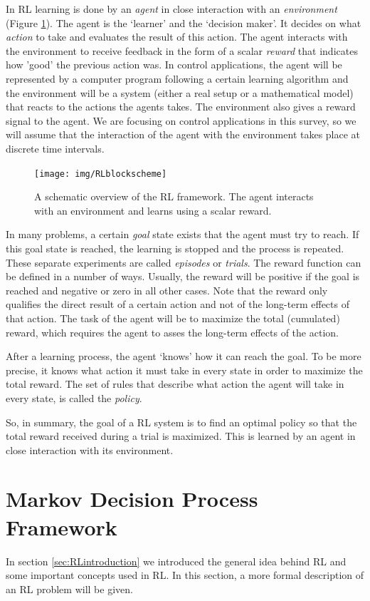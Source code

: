 \documentclass[a4paper,11pt]{mscLiterature}
\begin{document}
In RL learning is done by an \emph{agent} in close interaction with an \emph{environment} (Figure \ref{fig:RLframework}). The agent is the `learner' and the `decision maker'. It decides on what \emph{action} to take and evaluates the result of this action. The agent interacts with the environment to receive feedback in the form of a scalar \emph{reward} that indicates how 'good' the previous action was. In control applications, the agent will be represented by a computer program following a certain learning algorithm and the environment will be a system (either a real setup or a mathematical model) that reacts to the actions the agents takes. The environment also gives a reward signal to the agent. We are focusing on control applications in this survey, so we will assume that the interaction of the agent with the environment takes place at discrete time intervals. 
\begin{figure}[htbp]
	\centering
		\texttt{[image: img/RLblockscheme]}
	\caption{A schematic overview of the RL framework. The agent interacts with an environment and learns using a scalar reward.}
	\label{fig:RLframework}
\end{figure}
In many problems, a certain \emph{goal} state exists that the agent must try to reach. If this goal state is reached, the learning is stopped and the process is repeated. These separate experiments are called \emph{episodes} or \emph{trials}. The reward function can be defined in a number of ways. Usually, the reward will be positive if the goal is reached and negative or zero in all other cases. Note that the reward only qualifies the direct result of a certain action and not of the long-term effects of that action. The task of the agent will be to maximize the total (cumulated) reward, which requires the agent to asses the long-term effects of the action.

After a learning process, the agent `knows' how it can reach the goal. To be more precise, it knows what action it must take in every state in order to maximize the total reward. The set of rules that describe what action the agent will take in every state, is called the \emph{policy}.

So, in summary, the goal of a RL system is to find an optimal policy so that the total reward received during a trial is maximized. This is learned by an agent in close interaction with its environment.

\section{Markov Decision Process Framework} \label{sec:MDPframework}
In section \ref{sec:RLintroduction} we introduced the general idea behind RL and some important concepts used in RL. In this section, a more formal description of an RL problem will be given.
\end{document}
